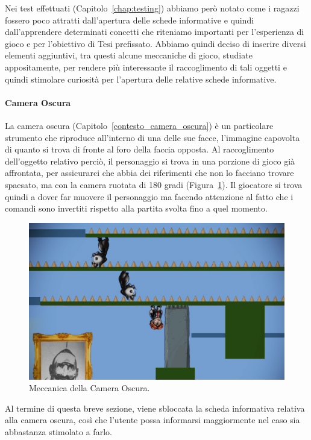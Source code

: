 Nei test effettuati (Capitolo~\ref{chap:testing}) abbiamo però notato come i ragazzi fossero poco attratti dall’apertura delle schede informative e quindi dall’apprendere determinati concetti che riteniamo importanti per l’esperienza di gioco e per l’obiettivo di Tesi prefissato.
Abbiamo quindi deciso di inserire diversi elementi aggiuntivi, tra questi alcune meccaniche di gioco, studiate appositamente, per rendere più interessante il raccoglimento di tali oggetti e quindi stimolare curiosità per l’apertura delle relative schede informative.

\paragraph{Camera Oscura}
\label{par_meccanica_camera_oscura}
La camera oscura (Capitolo~\ref{contesto_camera_oscura}) è un particolare strumento che riproduce all’interno di una delle sue facce, l’immagine capovolta di quanto si trova di fronte al foro della faccia opposta.
Al raccoglimento dell’oggetto relativo perciò, il personaggio si trova in una porzione di gioco già affrontata, per assicurarci che abbia dei riferimenti che non lo facciano trovare spaesato, ma con la camera ruotata di 180 gradi (Figura~\ref{fig:meccaniche_precinema_camera_oscura}). Il giocatore si trova quindi a dover far muovere il personaggio ma facendo attenzione al fatto che i comandi sono invertiti rispetto alla partita svolta fino a quel momento.

\begin{figure}%
	\centering
	\includegraphics[width= 0.8\columnwidth]{images/gameDesign/23_cameraOscura.jpg}
	\caption{Meccanica della Camera Oscura.}
	\label{fig:meccaniche_precinema_camera_oscura}
\end{figure} 

Al termine di questa breve sezione, viene sbloccata la scheda informativa relativa alla camera oscura, così che l’utente possa informarsi maggiormente nel caso sia abbastanza stimolato a farlo.

